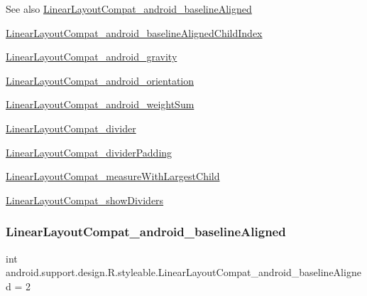 \begin{DoxySeeAlso}{See also}
\hyperlink{classandroid_1_1support_1_1design_1_1R_1_1styleable_a9d55bf7dbe65d98e7ba6f34b30430e6c}{Linear\+Layout\+Compat\+\_\+android\+\_\+baseline\+Aligned} 

\hyperlink{classandroid_1_1support_1_1design_1_1R_1_1styleable_a37112cf8a879aba4faa808e638c0f956}{Linear\+Layout\+Compat\+\_\+android\+\_\+baseline\+Aligned\+Child\+Index} 

\hyperlink{classandroid_1_1support_1_1design_1_1R_1_1styleable_a0c12043536404528247f7baea154f226}{Linear\+Layout\+Compat\+\_\+android\+\_\+gravity} 

\hyperlink{classandroid_1_1support_1_1design_1_1R_1_1styleable_af6d43237e69e14453825f99f1ca834ee}{Linear\+Layout\+Compat\+\_\+android\+\_\+orientation} 

\hyperlink{classandroid_1_1support_1_1design_1_1R_1_1styleable_a849b25d442594683c74cbb079d01e97c}{Linear\+Layout\+Compat\+\_\+android\+\_\+weight\+Sum} 

\hyperlink{classandroid_1_1support_1_1design_1_1R_1_1styleable_af717aeae3bc1ab1dd5fa67dd5dbcf7f4}{Linear\+Layout\+Compat\+\_\+divider} 

\hyperlink{classandroid_1_1support_1_1design_1_1R_1_1styleable_ab9d976c9fc0ba16e05e50c57f510e043}{Linear\+Layout\+Compat\+\_\+divider\+Padding} 

\hyperlink{classandroid_1_1support_1_1design_1_1R_1_1styleable_a5ea39aa0bc15c41a608e69496fecb711}{Linear\+Layout\+Compat\+\_\+measure\+With\+Largest\+Child} 

\hyperlink{classandroid_1_1support_1_1design_1_1R_1_1styleable_af92c8ae01241fac2f25cd795b2d750aa}{Linear\+Layout\+Compat\+\_\+show\+Dividers} 
\end{DoxySeeAlso}
\mbox{\label{classandroid_1_1support_1_1design_1_1R_1_1styleable_a9d55bf7dbe65d98e7ba6f34b30430e6c}} 
\subsubsection{\texorpdfstring{Linear\+Layout\+Compat\+\_\+android\+\_\+baseline\+Aligned}{LinearLayoutCompat\_android\_baselineAligned}}
{\footnotesize\ttfamily int android.\+support.\+design.\+R.\+styleable.\+Linear\+Layout\+Compat\+\_\+android\+\_\+baseline\+Aligned = 2\hspace{0.3cm}{\ttfamily [static]}}


